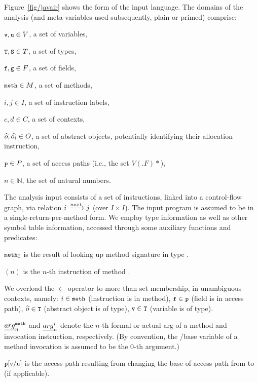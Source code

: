 Figure~\ref{fig/javair} shows the form of the input language.
The domains of the analysis (and meta-variables used subsequently,
plain or primed) comprise:
\begin{compactitem}[\(\cdot\)]
\item \({\small {\texttt{v}}},{\small {\texttt{u}}} \in V\), a set of variables, 
\item \({\small {\texttt{T}}}, {\small {\texttt{S}}} \in T\), a set of types,
\item \({\small {\texttt{f}}}, {\small {\texttt{g}}} \in F\), a set of fields,
\item \({\small {\texttt{meth}}} \in M\), a set of methods, 
\item \(i,j \in I\), a set of instruction labels,
\item \(c,d \in C\), a set of contexts,
\item \({\widehat{o}}, {\widehat{o_{i}}} \in O\), a set of abstract objects, potentially identifying their allocation instruction,
\item \({\small {\texttt{p}}} \in P\), a set of access paths (i.e., the set $V(.F)*$),
\item \(n \in \mathbb{N}\), the set of natural numbers.
\end{compactitem}

The analysis input consists of a set of instructions, linked into a
control-flow graph, via relation \({i} \xrightarrow{next} {j}\) (over \(I \!\times\!
I\)). The input program is assumed to be in a single-return-per-method
form.  We employ type information as well as other symbol table information,
accessed through some auxiliary functions and predicates:
\begin{compactitem}[\(\cdot\)]
\item \({\small {\texttt{meth}}}_{{\small {\texttt{T}}}}\) is the result of looking up method signature  in type .
\item {}\((n)\) is the \(n\)-th instruction of method .
\item We overload the \(\in\) operator to more than set membership, in unambiguous contexts, namely: \(i \in {\small {\texttt{meth}}}\) (instruction is in method), \({\small {\texttt{f}}} \in {\small {\texttt{p}}}\) (field is in access path), \({\widehat{o}} \in {\small {\texttt{T}}}\) (abstract object is of type), \({\small {\texttt{v}}} \in {\small {\texttt{T}}}\) (variable is of type).
\item \({\emph{arg}}^{{\small {\texttt{meth}}}}_{n}\) and
\({\emph{arg}}^{i}_{n}\) denote the \(n\)-th formal or actual arg of a method
and invocation instruction, respectively. (By convention, the
/base variable of a method invocation is assumed to be the
0-th argument.)
\item \({\small {\texttt{p}}}[{{\small {\texttt{v}}}}/{{\small {\texttt{u}}}}]\) is the access path resulting from changing the base of access path  from  to  (if applicable).
\end{compactitem}




